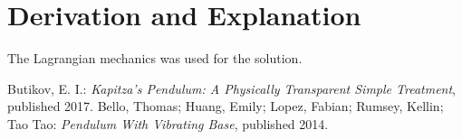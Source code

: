 \documentclass[10pt,a4paper]{article}
\begin{document}
	
	\section{Derivation and Explanation} %
	The Lagrangian mechanics was used for the solution.
	
	
	\begin{thebibliography}{10}		
		Butikov, E. I.: 
		\textit{Kapitza’s Pendulum: A Physically Transparent Simple Treatment}, published 2017.
		Bello, Thomas; Huang, Emily; Lopez, Fabian; Rumsey, Kellin; Tao Tao: 
		\textit{Pendulum With Vibrating Base}, published 2014.
	\end{thebibliography}	
		
\end{document}

